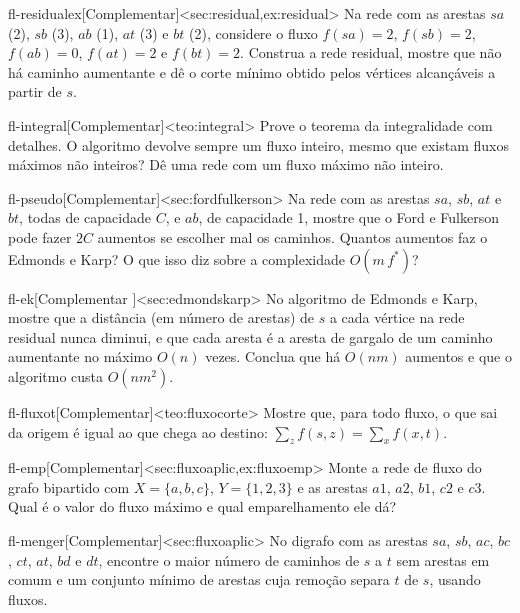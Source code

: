 \begin{exercicio}{fl-residualex}[Complementar]<sec:residual,ex:residual>
Na rede com as arestas $sa$ (2), $sb$ (3), $ab$ (1), $at$ (3) e $bt$ (2), considere o fluxo $f(sa)=2$, $f(sb)=2$, $f(ab)=0$, $f(at)=2$ e $f(bt)=2$. Construa a rede residual, mostre que não há caminho aumentante e dê o corte mínimo obtido pelos vértices alcançáveis a partir de $s$.
\end{exercicio}
\begin{exercicio}{fl-integral}[Complementar]<teo:integral>
Prove o teorema da integralidade com detalhes. O algoritmo devolve sempre um fluxo inteiro, mesmo que existam fluxos máximos não inteiros? Dê uma rede com um fluxo máximo não inteiro.
\end{exercicio}
\begin{exercicio}{fl-pseudo}[Complementar]<sec:fordfulkerson>
Na rede com as arestas $sa$, $sb$, $at$ e $bt$, todas de capacidade $C$, e $ab$, de capacidade 1, mostre que o Ford e Fulkerson pode fazer $2C$ aumentos se escolher mal os caminhos. Quantos aumentos faz o Edmonds e Karp? O que isso diz sobre a complexidade $O(m\,f^*)$?
\end{exercicio}
\begin{exercicio}{fl-ek}[Complementar \estrela]<sec:edmondskarp>
No algoritmo de Edmonds e Karp, mostre que a distância (em número de arestas) de $s$ a cada vértice na rede residual nunca diminui, e que cada aresta é a aresta de gargalo de um caminho aumentante no máximo $O(n)$ vezes. Conclua que há $O(nm)$ aumentos e que o algoritmo custa $O(nm^2)$.
\end{exercicio}
\begin{exercicio}{fl-fluxot}[Complementar]<teo:fluxocorte>
Mostre que, para todo fluxo, o que sai da origem é igual ao que chega ao destino: $\sum_zf(s,z)=\sum_xf(x,t)$.
\end{exercicio}
\begin{exercicio}{fl-emp}[Complementar]<sec:fluxoaplic,ex:fluxoemp>
Monte a rede de fluxo do grafo bipartido com $X=\{a,b,c\}$, $Y=\{1,2,3\}$ e as arestas $a1$, $a2$, $b1$, $c2$ e $c3$. Qual é o valor do fluxo máximo e qual emparelhamento ele dá?
\end{exercicio}
\begin{exercicio}{fl-menger}[Complementar]<sec:fluxoaplic>
No digrafo com as arestas $sa$, $sb$, $ac$, $bc$, $ct$, $at$, $bd$ e $dt$, encontre o maior número de caminhos de $s$ a $t$ sem arestas em comum e um conjunto mínimo de arestas cuja remoção separa $t$ de $s$, usando fluxos.
\end{exercicio}
